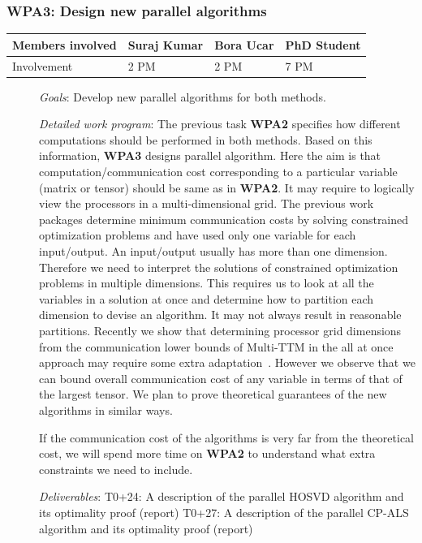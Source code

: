 \documentclass[a4paper,11pt]{article}
\newcommand{\subtask}[1]{{\color{orange}\paragraph{#1}$ $}}
\newcommand{\goal}{{\color{orange2}  \emph{Goals}:} }
\newcommand{\dwp}{{\color{orange2}  \emph{Detailed work program}: }}
\newcommand{\deliverables}{{\color{orange2}  \emph{Deliverables}: }}
\begin{document}
	\subsubsection{\textbf{WPA3}: Design new parallel algorithms}
	\begin{table}[H]
		\begin{tabular}{llll}
			\hline
			\cellcolor{blue2}
			Members involved & Suraj Kumar& Bora Ucar & PhD Student \\
			\hline
			\cellcolor{orange2}
			Involvement      & 2 PM            & 2 PM & 7 PM \\
			\hline
		\end{tabular}
	\end{table}
	\begin{description}
		\item[] \goal Develop new parallel algorithms for both methods.
		\item[] \dwp The previous task \textbf{WPA2} specifies how different computations should be performed in both methods. Based on this information, \textbf{WPA3} designs parallel algorithm. Here the aim is that computation/communication cost corresponding to a particular variable (matrix or tensor) should be same as in \textbf{WPA2}. It may require to logically view the processors in a multi-dimensional grid. The previous work packages determine minimum communication costs by solving constrained optimization problems and have used only one variable for each input/output. An input/output usually has more than one dimension. Therefore we need to interpret the solutions of constrained optimization problems in multiple dimensions. This requires us to look at all the variables in a solution at once and determine how to partition each dimension to devise an algorithm. It may not always result in reasonable partitions. Recently we show that determining processor grid dimensions from the communication lower bounds of Multi-TTM in the all at once approach may require some extra adaptation~\cite{ABGKR-SIMAX-2024}. However we observe that we can bound overall communication cost of any variable in terms of that of the largest tensor. We plan to prove theoretical guarantees of the new algorithms in similar ways.
		
		If the communication cost of the algorithms is very far from the theoretical cost, we will spend more time on \textbf{WPA2} to understand what extra constraints we need to include. 
		\item[] \deliverables\newline
		T0+24: A description of the parallel HOSVD algorithm and its optimality proof (report)\newline
		T0+27: A description of the parallel CP-ALS algorithm and its optimality proof (report) 
	\end{description}
	
\end{document}

